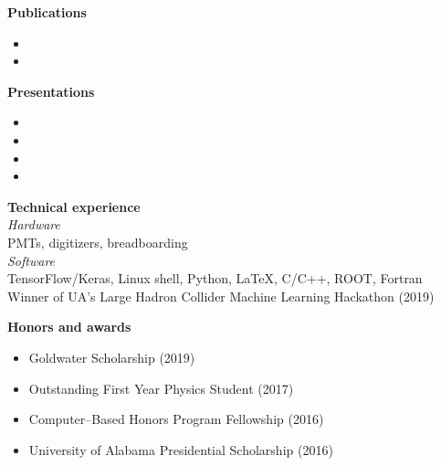 \documentclass{cv}
\begin{document}
	\begin{adjustwidth}{}{\rightedge}
	\textbf{Publications}
    \begin{itemize}
        \item {}
        \item {}
    \end{itemize}
    \vspace{0.2in}
	
    \textbf{Presentations}\\
    \begin{itemize}
        \item {}
        \item {}
        \item {}
        \item {}
    \end{itemize}
    \vspace{0.2in}

    \textbf{Technical experience}\\
    \textit{Hardware}\\
	PMTs, digitizers, breadboarding\\

	\vspace{-0.15in}
	\textit{Software}\\
	TensorFlow/Keras, Linux shell, Python, \LaTeX, C/C++, ROOT, Fortran\\
	Winner of UA's Large Hadron Collider Machine Learning Hackathon (2019)
	\vspace{0.2in}

	\textbf{Honors and awards}
	\begin{itemize}
	    \item Goldwater Scholarship (2019)
	    \item Outstanding First Year Physics Student (2017)
	    \item Computer--Based Honors Program Fellowship (2016)
	    \item University of Alabama Presidential Scholarship (2016)
    \end{itemize}
    \end{adjustwidth}
\end{document}
